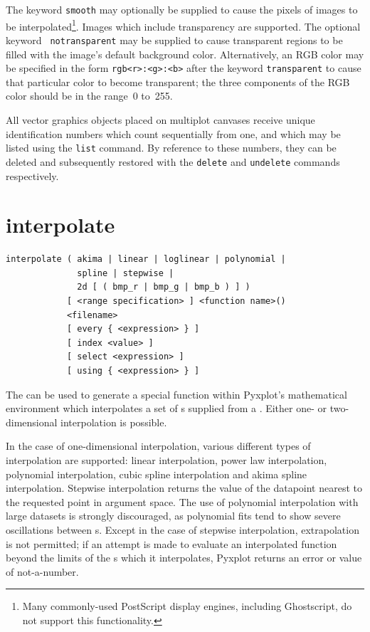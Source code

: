 The keyword {\tt smooth} may optionally be supplied to cause the pixels of
images to be interpolated\footnote{Many commonly-used PostScript display
engines, including Ghostscript, do not support this functionality.}.  Images
which include transparency are supported. The optional keyword {\tt
notransparent} may be supplied to cause transparent regions to be filled with
the image's default background color. Alternatively, an RGB color may be
specified in the form {\tt rgb<r>:<g>:<b>} after the keyword {\tt transparent}
to cause that particular color to become transparent; the three components of
the RGB color should be in the range~0 to~255.

All vector graphics objects placed on multiplot canvases receive unique
identification numbers which count sequentially from one, and which may be
listed using the {\tt list} command.  By reference to these numbers, they can
be deleted and subsequently restored with the {\tt delete} and {\tt undelete}
commands respectively.


\section{interpolate}

\begin{verbatim}
interpolate ( akima | linear | loglinear | polynomial |
              spline | stepwise |
              2d [ ( bmp_r | bmp_g | bmp_b ) ] )
            [ <range specification> ] <function name>()
            <filename>
            [ every { <expression> } ]
            [ index <value> ]
            [ select <expression> ]
            [ using { <expression> } ]
\end{verbatim}

The  can be used to generate a special function within
Pyxplot's mathematical environment which interpolates a set of \datapoint s
supplied from a \datafile. Either one- or two-dimensional interpolation is
possible.

In the case of one-dimensional interpolation, various different types of
interpolation are supported: linear interpolation, power law interpolation,
polynomial interpolation, cubic spline interpolation and akima spline
interpolation. Stepwise interpolation returns the value of the datapoint
nearest to the requested point in argument space. The use of polynomial
interpolation with large datasets is strongly discouraged, as polynomial fits
tend to show severe oscillations between \datapoint s.  Except in the case of
stepwise interpolation, extrapolation is not permitted; if an attempt is made
to evaluate an interpolated function beyond the limits of the \datapoint s
which it interpolates, Pyxplot returns an error or value of not-a-number.

